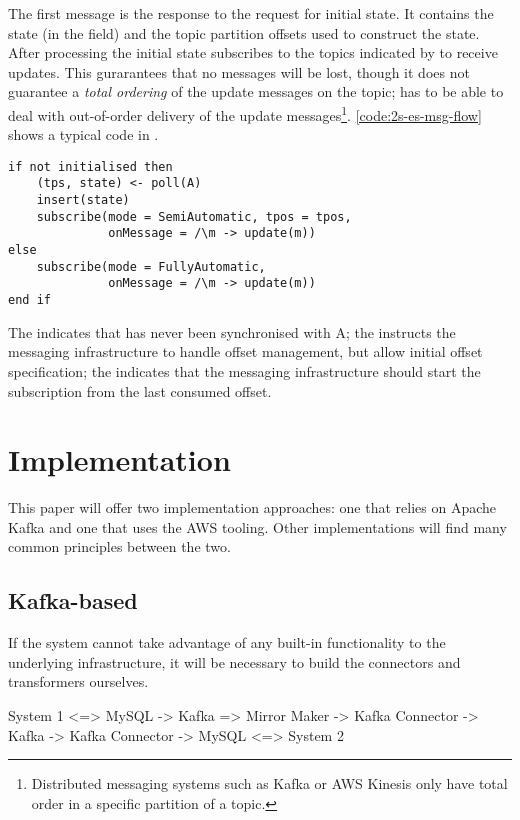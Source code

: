 
The first message is the response to the request for initial state. It contains the state (in the  field) and the topic partition offsets used to construct the state. After processing the initial state  subscribes to the topics indicated by  to receive updates. This gurarantees that no messages will be lost, though it does not guarantee a \emph{total ordering} of the update messages on the topic;  has to be able to deal with out-of-order delivery of the update messages\footnote{Distributed messaging systems such as Kafka\cite{kafka} or AWS Kinesis\cite{kinesis} only have total order in a specific partition of a topic.}. \autoref{code:2s-es-msg-flow} shows a typical code in .


\begin{lstlisting}[caption={Message flow}, label={code:2s-es-msg-flow}, language=Pseudo, escapechar=|]
if not initialised then 
    (tps, state) <- poll(A)
    insert(state)
    subscribe(mode = SemiAutomatic, tpos = tpos, 
              onMessage = /\m -> update(m))
else
    subscribe(mode = FullyAutomatic,
              onMessage = /\m -> update(m))
end if
\end{lstlisting}

The  indicates that  has never been synchronised with A; the  instructs the messaging infrastructure to handle offset management, but allow initial offset specification; the  indicates that the messaging infrastructure should start the subscription from the last consumed offset.

\section{Implementation}
This paper will offer two implementation approaches: one that relies on Apache Kafka and one that uses the AWS tooling. Other implementations will find many common principles between the two.

\subsection{Kafka-based}
If the system cannot take advantage of any built-in functionality to the underlying infrastructure, it will be necessary to build the connectors and transformers ourselves. 

System 1 <=> MySQL
          -> Kafka => Mirror Maker -> Kafka Connector -> Kafka -> Kafka Connector -> MySQL <=> System 2

